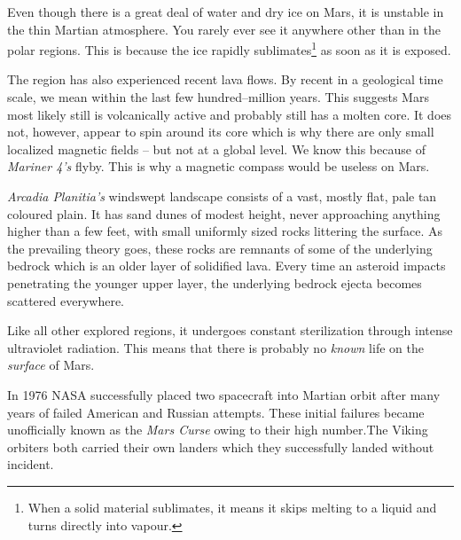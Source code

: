 Even though there is a great deal of water and dry ice on Mars, it is unstable in the thin Martian atmosphere. You rarely ever see it anywhere other than in the polar regions. This is because the ice rapidly sublimates\footnote{When a solid material sublimates, it means it skips melting to a liquid and turns directly into vapour.} as soon as it is exposed.

The region has also experienced recent lava flows. By recent in a geological time scale, we mean within the last few hundred--million years. This suggests Mars most likely still is volcanically active and probably still has a molten core. It does not, however, appear to spin around its core which is why there are only small localized magnetic fields -- but not at a global level. We know this because of {\it Mariner 4's} flyby. This is why a magnetic compass would be useless on Mars.

    {}
    {}
    {}
    \stopcombination

{\it Arcadia Planitia's} windswept landscape consists of a vast, mostly flat, pale tan coloured plain. It has sand dunes of modest height, never approaching anything higher than a few feet, with small uniformly sized rocks littering the surface. As the prevailing theory goes, these rocks are remnants of some of the underlying bedrock which is an older layer of solidified lava. Every time an asteroid impacts penetrating the younger upper layer, the underlying bedrock ejecta becomes scattered everywhere.

Like all other explored regions, it undergoes constant sterilization through intense ultraviolet radiation. This means that there is probably no {\it known} life on the {\it surface} of Mars.

\page
{}

In 1976 NASA successfully placed two spacecraft into Martian orbit after many years of failed American and Russian attempts. These initial failures became unofficially known as the {\it Mars Curse} owing to their high number. The Viking orbiters both carried their own landers which they successfully landed without incident.

